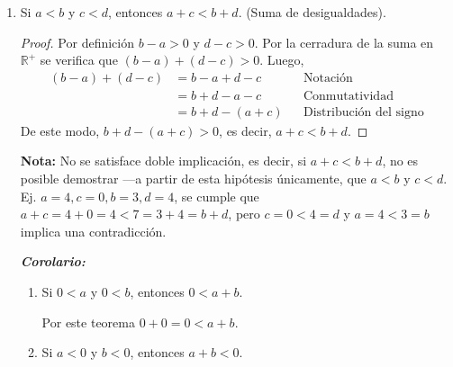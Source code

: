 \documentclass[11pt]{article}
\newcommand{\R}{\mathbb{R}}
\newcommand{\bfit}[1]{\textbf{\textit{#1}}}
\begin{document}
\begin{enumerate}[label=\alph*)]
    \item Si $a<b$ y $c < d$, entonces $a+c<b+d$. (Suma de desigualdades).
    \vspace{-1em}\begin{proof} 
        Por definición $b-a>0$ y $d-c>0$. Por la cerradura de la suma en $\R^+$ se verifica que $(b-a)+(d-c)>0$. Luego, \begin{align*}
            (b-a)+(d-c) &= b-a+d-c && \text{Notación}\\
            &= b+d-a-c && \text{Conmutatividad}\\
            &= b+d - (a+c) && \text{Distribución del signo}
            \end{align*}
        De este modo, $b+d-(a+c)>0$, es decir, $a+c<b+d$.    
    \end{proof} \vspace{-1em}
    \textbf{Nota:} No se satisface doble implicación, es decir, si $a+c<b+d$, no es posible demostrar —a partir de esta hipótesis únicamente, que $a<b$ y $c<d$. Ej. $a=4, c=0, b=3, d=4$, se cumple que $a+c=4+0=4<7=3+4=b+d$, pero $c=0<4=d$ y $a=4<3=b$ implica una contradicción.

    \bfit{Corolario:}\begin{enumerate}[label=\roman*)]
        \item Si $0<a$ y $0<b$, entonces $0<a+b$.
        
        Por este teorema $0+0=0<a+b$.

        \item Si $a<0$ y $b<0$, entonces $a+b<0$.
        

\end{enumerate}
\end{enumerate}
\end{document}
